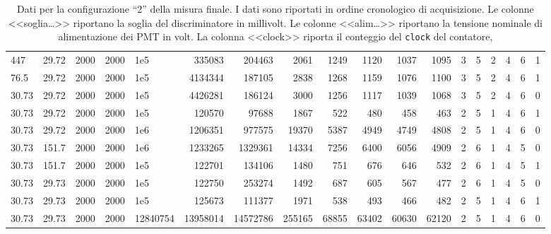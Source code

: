 \begin{landscape}
\begin{table}[p]
\begin{tabular}{llll|lrrrrrrr|ccccc|c}
			447 & 29.72 & 2000 & 2000 & 1e5 & 335083 & 204463 & 2061 & 1249 & 1120 & 1037 & 1095 & 3 & 5 & 2 & 4 & 6 & 1    \\   %
			76.5 & 29.72 & 2000 & 2000 & 1e5 & 4134344 & 187105 & 2838 & 1268 & 1159 & 1076 & 1100 & 3 & 5 & 2 & 4 & 6 & 1      \\   %
			30.73 & 29.72 & 2000 & 2000 & 1e5 & 4426281 & 186124 & 3000 & 1256 & 1117 & 1039 & 1068 & 3 & 5 & 2 & 4 & 6 & 0     \\  %
			\hline
			30.73 & 29.72 & 2000 & 2000 & 1e5 & 120570 & 97688 & 1867 & 522 & 480 & 458 & 463 & 2 & 5 & 1 & 4 & 6 & 1                             \\
			30.73 & 29.72 & 2000 & 2000 & 1e6 & 1206351 & 977575 & 19370 & 5387 & 4949 & 4749 & 4808 & 2 & 5 & 1 & 4 & 6 & 0                      \\
			\hline
			30.73 & 151.7 & 2000 & 2000 & 1e6 & 1233265 & 1329361 & 14334 & 7256 & 6400 & 6056 & 4909 & 2 & 6 & 1 & 4 & 5 & 0                   \\
			30.73 & 151.7 & 2000 & 2000 & 1e5 & 122701 & 134106 & 1480 & 751 & 676 & 646 & 532 & 2 & 6 & 1 & 4 & 5 & 1                          \\
			30.73 & 29.73 & 2000 & 2000 & 1e5 & 122750 & 253274 & 1492 & 687 & 605 & 567 & 477 & 2 & 6 & 1 & 4 & 5 & 0                            \\
			\hline
			30.73 & 29.73 & 2000 & 2000 & 1e5 & 125673 & 111377 & 1971 & 538 & 493 & 466 & 482 & 2 & 5 & 1 & 4 & 6 & 1                            \\
			30.73 & 29.73 & 2000 & 2000 & 12840754 & 13958014 & 14572786 & 255165 & 68855 & 63402 & 60630 & 62120 & 2 & 5 & 1 & 4 & 6 & 0         
		\end{tabular}
		\caption{\label{tab:data2}
		Dati per la configurazione ``2'' della misura finale.
		I dati sono riportati in ordine cronologico di acquisizione.
		Le colonne <<soglia\dots>> riportano la soglia del discriminatore in millivolt.
		Le colonne <<alim\dots>> riportano la tensione nominale di alimentazione dei PMT in volt.
		La colonna <<clock>> riporta il conteggio del \texttt{clock} del contatore,
}
\end{table}
\end{landscape}

